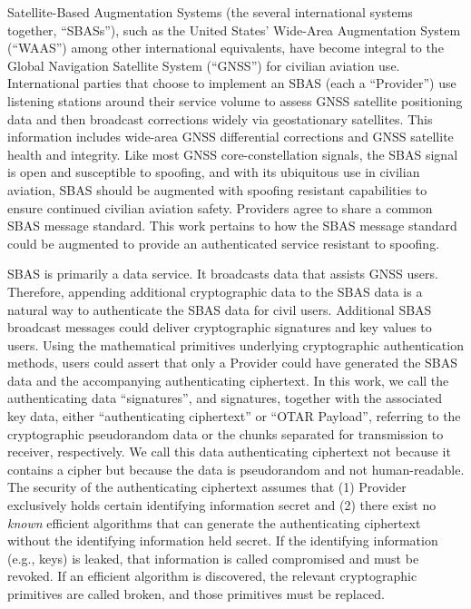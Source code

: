 \documentclass[letterpaper,times]{IONconf/IONconf}
\begin{document}
	Satellite-Based Augmentation Systems (the several international systems together, ``SBASs''), such as the United States' Wide-Area Augmentation System (``WAAS'') among other international equivalents, have become integral to the Global Navigation Satellite System (``GNSS'') for civilian aviation use.
	International parties that choose to implement an SBAS (each a ``Provider'') use listening stations around their service volume to assess GNSS satellite positioning data and then broadcast corrections widely via geostationary satellites.
	This information includes wide-area GNSS differential corrections and GNSS satellite health and integrity.
	Like most GNSS core-constellation signals, the SBAS signal is open and susceptible to spoofing, and with its ubiquitous use in civilian aviation, SBAS should be augmented with spoofing resistant capabilities to ensure continued civilian aviation safety.
	Providers agree to share a common SBAS message standard.
	This work pertains to how the SBAS message standard could be augmented to provide an authenticated service resistant to spoofing.

	SBAS is primarily a data service.
	It broadcasts data that assists GNSS users.
	Therefore, appending additional cryptographic data to the SBAS data is a natural way to authenticate the SBAS data for civil users.
	Additional SBAS broadcast messages could deliver cryptographic signatures and key values to users.
	Using the mathematical primitives underlying cryptographic authentication methods, users could assert that only a Provider could have generated the SBAS data and the accompanying authenticating ciphertext.
	In this work, we call the authenticating data ``signatures'', and signatures, together with the associated key data, either ``authenticating ciphertext'' or ``OTAR Payload'', referring to the cryptographic pseudorandom data or the chunks separated for transmission to receiver, respectively.
	We call this data authenticating ciphertext not because it contains a cipher but because the data is pseudorandom and not human-readable.
	The security of the authenticating ciphertext assumes that (1) Provider exclusively holds certain identifying information secret and (2) there exist no {\em known} efficient algorithms that can generate the authenticating ciphertext without the identifying information held secret.
	If the identifying information (e.g., keys) is leaked, that information is called compromised and must be revoked.
	If an efficient algorithm is discovered, the relevant cryptographic primitives are called broken, and those primitives must be replaced.
\end{document}
